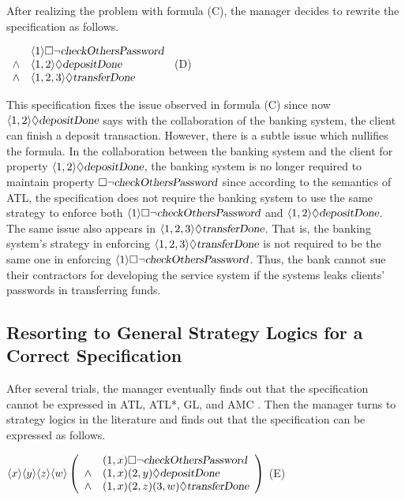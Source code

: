 After realizing the problem with formula (C), the manager decides to rewrite the specification as follows.
\begin{center} \hfill 
$\begin{array}{cl}
		& \langle 1\rangle \Box\neg \mbox{\sl checkOthersPassword}\\
\wedge 	& \langle 1,2\rangle \Diamond \mbox{\sl depositDone} \\
\wedge  & \langle 1,2, 3\rangle\Diamond\mbox{\sl transferDone} 
\end{array}$
\hfill (D) 
\end{center}   
This specification fixes the issue observed in formula (C) since now $\langle 1,2\rangle\Diamond\mbox{\sl depositDone}$ says with the collaboration of the banking system, the client can finish a deposit transaction.  
However, there is a subtle issue which nullifies the formula.  
In the collaboration between the banking system and the client for property $\langle 1,2\rangle\Diamond\mbox{\sl depositDone}$, the banking system is no longer required to maintain property $\Box\neg \mbox{\sl checkOthersPassword}$ since according to the semantics of ATL, the specification does not require the banking system to use the same strategy to enforce both $\langle 1\rangle \Box\neg \mbox{\sl checkOthersPassword}$ and $\langle 1,2\rangle \Diamond \mbox{\sl depositDone}$.  
The same issue also appears in $\langle 1,2,3\rangle\Diamond\mbox{\sl transferDone}$.  
That is, the banking system's strategy in enforcing $\langle 1,2,3\rangle\Diamond\mbox{\sl transferDone}$ is not required to be the same one in enforcing $\langle 1\rangle \Box\neg \mbox{\sl checkOthersPassword}$.
Thus, the bank cannot sue their contractors for developing the service system if the systems leaks clients' passwords in transferring funds.

\subsection{Resorting to General Strategy Logics for a Correct Specification}
After several trials, the manager eventually finds out that the specification cannot be expressed in ATL, ATL*, GL, and AMC \cite{AHK02}.
Then the manager turns to strategy logics \cite{CHP10,MMV10} in the literature and finds out that the specification can be expressed as follows. 
\begin{center} \hfill 
$\langle x\rangle \langle y\rangle\langle z\rangle \langle w\rangle \left(\begin{array}{cl}
		& (1,x)\Box\neg \mbox{\sl checkOthersPassword}\\
\wedge 	& (1,x)(2,y)\Diamond \mbox{\sl depositDone} \\
\wedge  & (1,x)(2,z)(3,w)\Diamond\mbox{\sl transferDone} 
\end{array}\right)$
\hfill (E) 
\end{center}   

